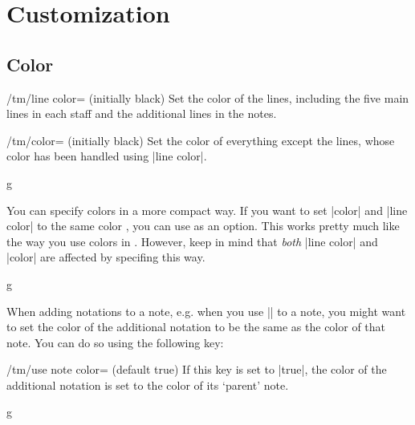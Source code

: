 \section{Customization}\label{sec:custom}
\subsection{Color}\label{sec:custom:color}
\begin{key}{/tm/line color= (initially black)}
  Set the color of the lines, including the five main lines in each staff and 
  the additional lines in the notes.
\end{key}
\begin{key}{/tm/color= (initially black)}
  Set the color of everything except the lines, whose color has been handled using 
  |line color|.
\end{key}
\begin{codeexample}[]
\begin{tmline}
\begin{tmstaff}[color=red,line color=blue]{g}{}
\end{tmstaff}
\end{tmline}
\end{codeexample}
You can specify colors in a more compact way. If you want to set |color| and 
|line color| to the same color , you can use  as an 
option. This works pretty much like the way you use colors in \tikzname. However, 
keep in mind that \emph{both} |line color| and |color| are affected by specifing 
this way.
\begin{codeexample}[]
\begin{tmline}
\begin{tmstaff}{g}{}
\end{tmstaff}
\end{tmline}
\end{codeexample}
When adding notations to a note, e.g. when you use |\tmarpeggio| to a 
note, you might want to set the color of the additional notation to be the same 
as the color of that note. You can do so using the following key:
\begin{key}{/tm/use note color= (default true)}
  If this key is set to |true|, the color of the additional notation is set to 
  the color of its `parent' note.
\end{key}
\begin{codeexample}[]
\begin{tmline}
\begin{tmstaff}{g}{}
\end{tmstaff}
\end{tmline}
\end{codeexample}
